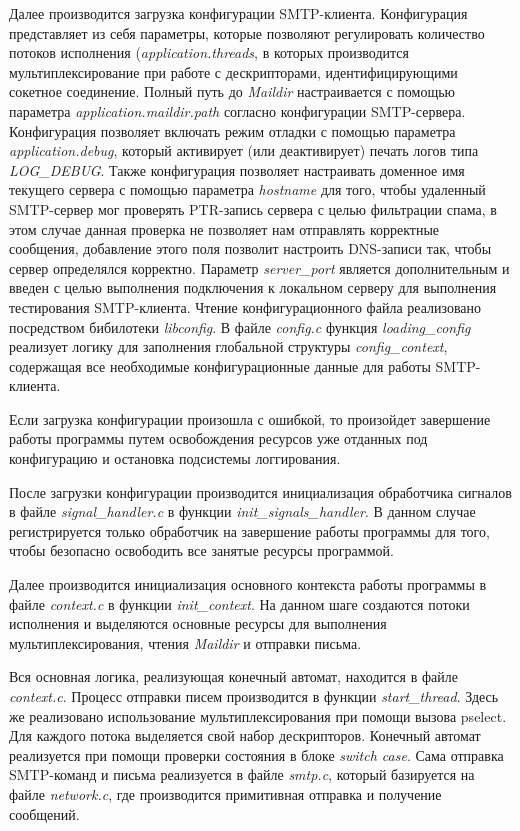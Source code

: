 \documentclass[a4paper,12pt]{report}
\begin{document}
	Далее производится загрузка конфигурации SMTP-клиента. Конфигурация представляет из себя параметры, которые позволяют регулировать количество потоков исполнения (\textit{application.threads}, в которых производится мультиплексирование при работе с дескрипторами, идентифицирующими сокетное соединение. Полный путь до \textit{Maildir} настраивается с помощью параметра \textit{application.maildir.path} согласно конфигурации SMTP-сервера. Конфигурация позволяет включать режим отладки с помощью параметра \textit{application.debug}, который активирует (или деактивирует) печать логов типа \textit{LOG\_DEBUG}. Также конфигурация позволяет настраивать доменное имя текущего сервера с помощью параметра \textit{hostname} для того, чтобы удаленный SMTP-сервер мог проверять PTR-запись сервера с целью фильтрации спама, в этом случае данная проверка не позволяет нам отправлять корректные сообщения, добавление этого поля позволит настроить DNS-записи так, чтобы сервер определялся корректно. Параметр \textit{server\_port} является дополнительным и введен с целью выполнения подключения к локальном серверу для выполнения тестирования SMTP-клиента. Чтение конфигурационного файла реализовано посредством бибилотеки \textit{libconfig}. В файле \textit{config.c} функция \textit{loading\_config} реализует логику для заполнения глобальной структуры \textit{config\_context}, содержащая все необходимые конфигурационные данные для работы SMTP-клиента.


	Если загрузка конфигурации произошла с ошибкой, то произойдет завершение работы программы путем освобождения ресурсов уже отданных под конфигурацию и остановка подсистемы логгирования.
	
	После загрузки конфигурации производится инициализация обработчика сигналов в файле \textit{signal\_handler.c} в функции \textit{init\_signals\_handler}. В данном случае регистрируется только обработчик на завершение работы программы для того, чтобы безопасно освободить все занятые ресурсы программой.
	
	Далее производится инициализация основного контекста работы программы в файле \textit{context.c} в функции \textit{init\_context}. На данном шаге создаются потоки исполнения и выделяются основные ресурсы для выполнения мультиплексирования, чтения \textit{Maildir} и отправки письма.

	Вся основная логика, реализующая конечный автомат, находится в файле \textit{context.c}. Процесс отправки писем производится в функции \textit{start\_thread}. Здесь же реализовано использование мультиплексирования при помощи вызова pselect. Для каждого потока выделяется свой набор дескрипторов. Конечный автомат реализуется при помощи проверки состояния в блоке \textit{switch case}. Сама отправка SMTP-команд и письма реализуется в файле \textit{smtp.c}, который базируется на файле \textit{network.c}, где производится примитивная отправка и получение сообщений.
\end{document}

